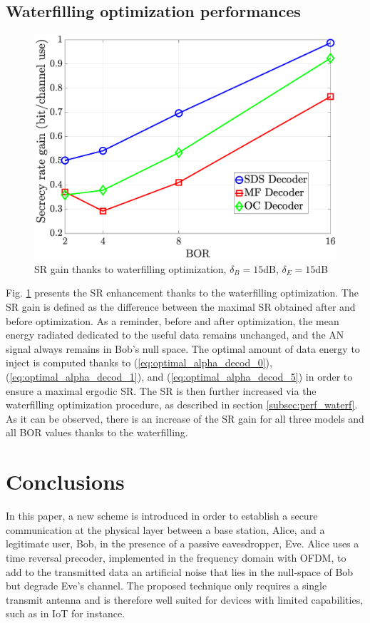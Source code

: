 \documentclass[journal,comsoc]{IEEEtran}
\let\MYoriglatexcaption\caption
\renewcommand{\caption}[2][\relax]{\MYoriglatexcaption[#2]{#2}}
\begin{document}
\subsection{Waterfilling optimization performances}
\begin{figure}[h!t]
	\centering
	\includegraphics[width=1\linewidth]{graphs/SR_gain.eps}
	\caption{SR gain thanks to waterfilling optimization, $\delta_B  = 15$dB, $\delta_E = 15$dB}
	\label{fig_waterfilling_opt}
\end{figure}
Fig. \ref{fig_waterfilling_opt} presents the SR enhancement thanks to the waterfilling optimization. The SR gain is defined as the difference between the maximal SR obtained after and before optimization. As a reminder, before and after optimization, the mean energy radiated dedicated to the useful data remains unchanged, and the AN signal always remains in Bob's null space. The optimal amount of data energy to inject is computed thanks to (\ref{eq:optimal_alpha_decod_0}), (\ref{eq:optimal_alpha_decod_1}), and (\ref{eq:optimal_alpha_decod_5}) in order to ensure a maximal ergodic SR. The SR is then further increased via the waterfilling optimization procedure, as described in section \ref{subsec:perf_waterf}. As it can be observed, there is an increase of the SR gain for all three models and all BOR values thanks to the waterfilling. 

\section{Conclusions}\label{sec:conclusions}
In this paper, a new scheme is introduced in order to establish a secure communication at the physical layer between a base station, Alice, and a legitimate user, Bob, in the presence of a passive eavesdropper, Eve. Alice uses a time reversal precoder, implemented in the frequency domain with OFDM, to add to the transmitted data an artificial noise that lies in the null-space of Bob but degrade Eve’s channel. The proposed technique only requires a single transmit antenna and is therefore well suited for devices with limited capabilities, such as in IoT for instance. 
\end{document}
